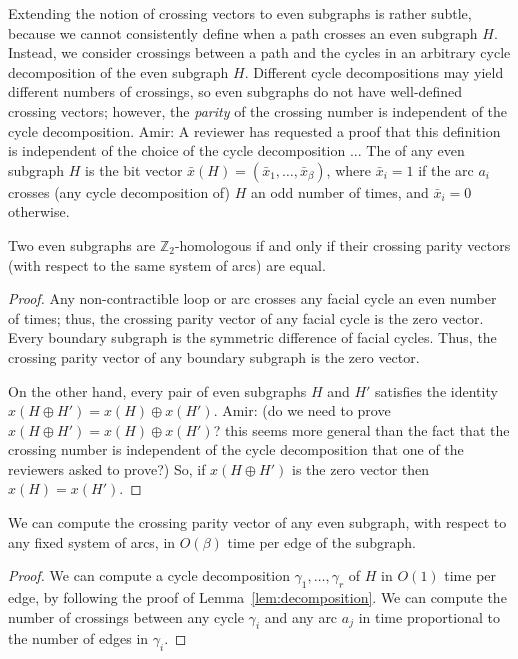 \documentclass[letterpaper,review]{siamart190516}
\def\Z{\mathbb{Z}}
\def\anote#1{\color{purple}Amir: #1 \color{black}}
\begin{document}
Extending the notion of crossing vectors to even subgraphs is rather subtle, because we cannot consistently define when a path crosses an even subgraph $H$.  Instead, we consider crossings between a path and the cycles in an arbitrary cycle decomposition of the even subgraph $H$.  Different cycle decompositions may yield different numbers of crossings, so even subgraphs do not have well-defined crossing vectors; however, the \emph{parity} of the crossing number is independent of the cycle decomposition.  
\anote{A reviewer has requested a proof that this definition is independent of the choice of the cycle decomposition ... }
The  of any even subgraph $H$ is the bit vector $\bar{x}(H) = (\bar{x}_1, \dots, \bar{x}_\beta)$, where $\bar{x}_i = 1$ if the arc $a_i$ crosses (any cycle decomposition of) $H$ an odd number of times, and $\bar{x}_i = 0$ otherwise.

\begin{lemma}
Two even subgraphs are $\Z_2$-homologous if and only if their crossing parity vectors (with respect to the same system of arcs) are equal.
\end{lemma}

\begin{proof}
Any non-contractible loop or arc crosses any facial cycle an even number of times; thus, the crossing parity vector of any facial cycle is the zero vector.  
Every boundary subgraph is the symmetric difference of facial cycles.  
Thus, the crossing parity vector of any boundary subgraph is the zero vector.

On the other hand, every pair of even subgraphs $H$ and $H'$ satisfies the identity $x(H\oplus H') = x(H) \oplus x(H')$. \anote{(do we need to prove $x(H\oplus H') = x(H) \oplus x(H')$? this seems more general than the fact that the crossing number is independent of the cycle decomposition that one of the reviewers asked to prove?)}
So, if $x(H\oplus H')$ is the zero vector then  $x(H) = x(H')$.
\end{proof}

\begin{lemma}
We can compute the crossing parity vector of any even subgraph, with respect to any fixed system of
arcs, in $O(\beta)$ time per edge of the subgraph.
\end{lemma}

\begin{proof}
We can compute a cycle decomposition $\gamma_1, \dots, \gamma_r$ of $H$ in $O(1)$ time per edge, by following the proof of Lemma~\ref{lem:decomposition}.
We can compute the number of crossings between any cycle $\gamma_i$ and any arc $a_j$ in time proportional to the number of edges in $\gamma_i$.
\end{proof}
\end{document}
